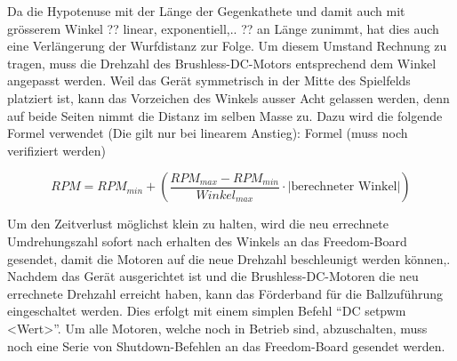 \newline
\newline
Da die Hypotenuse mit der Länge der Gegenkathete und damit auch mit grösserem Winkel ?? linear, exponentiell,.. ?? an Länge zunimmt, 
hat dies auch eine Verlängerung der Wurfdistanz zur Folge. Um diesem Umstand Rechnung zu tragen, muss die Drehzahl des 
Brushless-DC-Motors entsprechend dem Winkel angepasst werden. Weil das Gerät symmetrisch in der Mitte des Spielfelds platziert ist, 
kann das Vorzeichen des Winkels ausser Acht gelassen werden, denn auf beide Seiten nimmt die Distanz im selben Masse zu.
Dazu wird die folgende Formel verwendet (Die gilt nur bei linearem Anstieg):
\newline
\newline
Formel (muss noch verifiziert werden)
 
\begin{equation}
RPM = RPM_{min} +  \left( \frac{RPM_{max} -RPM_{min}}{Winkel_{max}} \cdot |\text{berechneter Winkel}| \right)
\end{equation}
 
Um den Zeitverlust möglichst klein zu halten, wird die neu errechnete Umdrehungszahl sofort nach erhalten des Winkels an das 
Freedom-Board gesendet, damit die Motoren auf die neue Drehzahl beschleunigt werden können,.
Nachdem das Gerät ausgerichtet ist und die Brushless-DC-Motoren die neu errechnete Drehzahl erreicht haben, kann das Förderband 
für die Ballzuführung eingeschaltet werden. Dies erfolgt mit einem simplen Befehl \enquote{DC setpwm <Wert>}. 
Um alle Motoren, welche noch in Betrieb sind, abzuschalten, muss noch eine Serie von Shutdown-Befehlen an das 
Freedom-Board gesendet werden. 


            
            
